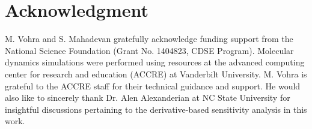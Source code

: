 \section*{Acknowledgment}
\label{sec:ack}

M. Vohra and S. Mahadevan gratefully acknowledge funding support from the
National Science Foundation (Grant No. 1404823, CDSE Program). Molecular
dynamics simulations were performed using resources at the advanced computing
center for research and education (ACCRE) at Vanderbilt University. 
M. Vohra is grateful to the ACCRE staff for their technical guidance
and support. He would also like to sincerely thank Dr. Alen Alexanderian at NC State 
University for
insightful discussions pertaining to the derivative-based sensitivity analysis
in this work.  


